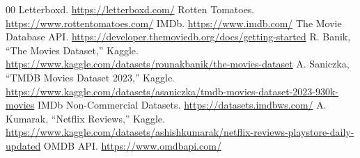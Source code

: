 \documentclass[conference]{IEEEtran}
\begin{document}
\vspace{4pt}

\appendix

\begin{thebibliography}{00}
 Letterboxd. \url{https://letterboxd.com/}
 Rotten Tomatoes. \url{https://www.rottentomatoes.com/}
 IMDb. \url{https://www.imdb.com/}
 The Movie Database API. \url{https://developer.themoviedb.org/docs/getting-started}
 R. Banik, ``The Movies Dataset,'' Kaggle. \url{https://www.kaggle.com/datasets/rounakbanik/the-movies-dataset}
 A. Saniczka, ``TMDB Movies Dataset 2023,'' Kaggle. \url{https://www.kaggle.com/datasets/asaniczka/tmdb-movies-dataset-2023-930k-movies}
 IMDb Non-Commercial Datasets. \url{https://datasets.imdbws.com/}
 A. Kumarak, ``Netflix Reviews,'' Kaggle. \url{https://www.kaggle.com/datasets/ashishkumarak/netflix-reviews-playstore-daily-updated}
 OMDB API. \url{https://www.omdbapi.com/}
\end{thebibliography}
\end{document}
